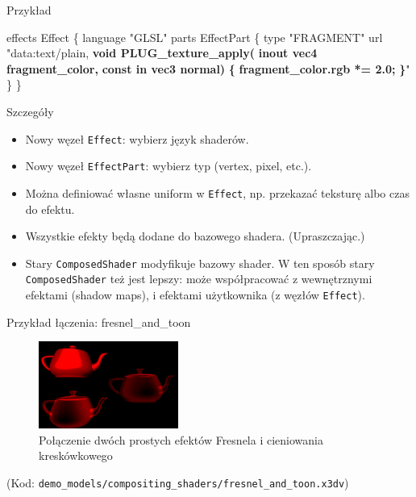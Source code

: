 \documentclass{beamer}
\begin{document}
\begin{frame}{Przykład}
\begin{semiverbatim}
effects Effect \{
  language "GLSL"
  parts EffectPart \{
    type "FRAGMENT"
    url "data:text/plain,
\textbf{    void PLUG\_texture\_apply(}
\textbf{      inout vec4 fragment\_color,}
\textbf{      const in vec3 normal)}
\textbf{    \{}
\textbf{      fragment\_color.rgb *= 2.0;}
\textbf{    \}}"
  \}
\}
\end{semiverbatim}
\end{frame}

\begin{frame}{Szczegóły}
\begin{itemize}
  \item Nowy węzeł \texttt{Effect}: wybierz język shaderów.
  \item Nowy węzeł \texttt{EffectPart}: wybierz typ (vertex, pixel, etc.).
  \item Można definiować własne uniform w \texttt{Effect}, np. przekazać
    teksturę albo czas do efektu.
  \item Wszystkie efekty będą dodane do bazowego shadera. (Upraszczając.)
  \item Stary \texttt{ComposedShader} modyfikuje bazowy shader.
    W ten sposób stary \texttt{ComposedShader} też jest lepszy:
    może współpracować z wewnętrznymi efektami (shadow maps),
    i efektami użytkownika (z węzłów \texttt{Effect}).
\end{itemize}
\end{frame}

\begin{frame}{Przykład łączenia: fresnel\_and\_toon}
\begin{figure}
  \centering
  \includegraphics[width=1.8in]{../fresnel_and_toon}
  \caption{Połączenie dwóch prostych efektów Fresnela i cieniowania kreskówkowego}
\end{figure}

(Kod: \texttt{demo\_models/compositing\_shaders/fresnel\_and\_toon.x3dv})

\end{frame}
\end{document}
